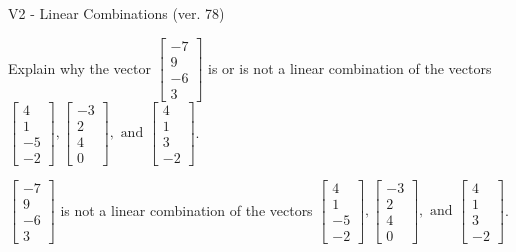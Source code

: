 \begin{exercise}
  \begin{exerciseTitle}V2 - Linear Combinations (ver. 78)\end{exerciseTitle}
  \begin{exerciseStatement}
    Explain why the vector \(\left[\begin{array}{c}
-7 \\
9 \\
-6 \\
3
\end{array}\right]\)  is or is not a linear 
	combination of the vectors \(\left[\begin{array}{c}
4 \\
1 \\
-5 \\
-2
\end{array}\right] , \left[\begin{array}{c}
-3 \\
2 \\
4 \\
0
\end{array}\right] , \text{ and } \left[\begin{array}{c}
4 \\
1 \\
3 \\
-2
\end{array}\right]\).
	


  \end{exerciseStatement}
  \begin{exerciseAnswer}
   \(\left[\begin{array}{c}
-7 \\
9 \\
-6 \\
3
\end{array}\right]\) 
  	 is not  
	a linear combination of the vectors \(\left[\begin{array}{c}
4 \\
1 \\
-5 \\
-2
\end{array}\right] , \left[\begin{array}{c}
-3 \\
2 \\
4 \\
0
\end{array}\right] , \text{ and } \left[\begin{array}{c}
4 \\
1 \\
3 \\
-2
\end{array}\right]\).

	
  


  \end{exerciseAnswer}
\end{exercise}